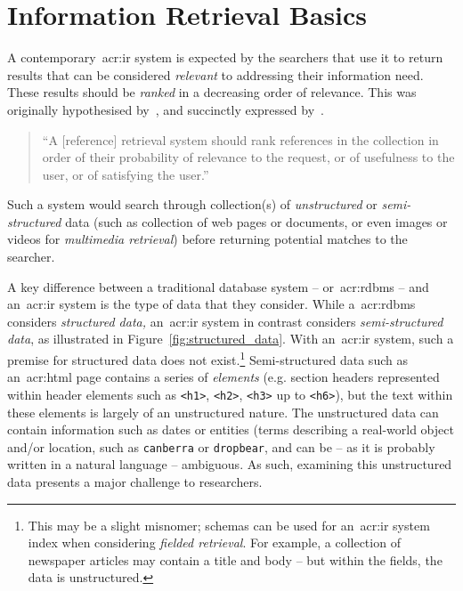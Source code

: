 \section{Information Retrieval Basics}
A contemporary~\gls{acr:ir} system is expected by the searchers that use it to return results that can be considered \emph{relevant} to addressing their information need. These results should be \emph{ranked} in a decreasing order of relevance. This was originally hypothesised by~\cite{luhn1957ranking_query}, and succinctly expressed by~\cite{robertson1977prp}.

\begin{quote}
    ``A [reference] retrieval system should rank references in the collection in order of their probability of relevance to the request, or of usefulness to the user, or of satisfying the user.''
\end{quote}

Such a system would search through collection(s) of \emph{unstructured} or \emph{semi-structured} data (such as collection of web pages or documents, or even images or videos for \emph{multimedia retrieval}) before returning potential matches to the searcher.

A key difference between a traditional database system -- or~\gls{acr:rdbms} -- and an~\gls{acr:ir} system is the type of data that they consider. While a~\gls{acr:rdbms} considers \emph{structured data,} an~\gls{acr:ir} system in contrast considers \emph{semi-structured data}, as illustrated in Figure~\ref{fig:structured_data}. With an~\gls{acr:ir} system, such a premise for structured data does not exist.\footnote{This may be a slight misnomer; schemas can be used for an~\gls{acr:ir} system index when considering \emph{fielded retrieval}. For example, a collection of newspaper articles may contain a title and body -- but within the fields, the data is unstructured.} Semi-structured data such as an~\gls{acr:html} page contains a series of \emph{elements} (e.g. section headers represented within header elements such as \texttt{<h1>}, \texttt{<h2>}, \texttt{<h3>} up to \texttt{<h6>}), but the text within these elements is largely of an unstructured nature. The unstructured data can contain information such as dates or entities (terms describing a real-world object and/or location, such as \texttt{canberra} or \texttt{dropbear}, and can be -- as it is probably written in a natural language -- ambiguous. As such, examining this unstructured data presents a major challenge to researchers.

